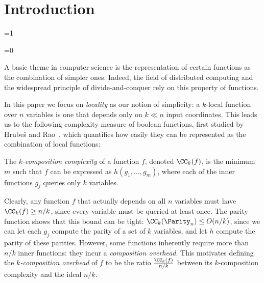\section{Introduction}


\def\colorful{0}


\ifnum\colorful=1
\newcommand{\violet}[1]{{\color{violet}{#1}}}
\newcommand{\orange}[1]{{\color{orange}{#1}}}
\newcommand{\blue}[1]{{{\color{blue}#1}}}
\newcommand{\red}[1]{{\color{red} {#1}}}
\newcommand{\green}[1]{{\color{green} {#1}}}
\newcommand{\pink}[1]{{\color{pink}{#1}}}
\newcommand{\gray}[1]{{\color{gray}{#1}}}

\fi
\ifnum\colorful=0
\newcommand{\violet}[1]{{{#1}}}
\newcommand{\orange}[1]{{{#1}}}
\newcommand{\blue}[1]{{{#1}}}
\newcommand{\red}[1]{{{#1}}}
\newcommand{\green}[1]{{{#1}}}
\newcommand{\gray}[1]{{{#1}}}

\fi


\def\showgray{0}


\renewcommand{\gray}[1]{\vspace{2\baselineskip}}



A basic theme in computer science is the representation of certain functions as the combination of simpler ones.
Indeed, the field of distributed computing and the widespread principle of divide-and-conquer rely on this property of functions.

In this paper we focus on \emph{locality} as our notion of simplicity: a $k$-local function over $n$ variables is one that depends only on $k \ll n$ input coordinates.
This leads us to the following complexity measure of boolean functions, first
studied
by Hrube\v{s} and Rao~\cite{HR15}, which quantifies how easily they can be represented as the combination of local functions:


\begin{definition}
\label{def:complexity}
The \emph{$k$-composition complexity} of a function $f$, denoted $\CC_k(f)$, is the minimum $m$ such that $f$ can be expressed as $h(g_1, \ldots, g_m)$, where each of the inner functions
$g_j$
queries only $k$ variables.
\end{definition}



Clearly, any function $f$ that actually depends on all $n$ variables must have $\CC_k(f) \geq n/k$, since every variable must be queried at least once.
The parity function shows that this bound can be tight: $\CC_k(\Parity_n) \leq O(n/k)$, since we can let each $g_j$ compute the parity of a set of
$k$ variables, and let $h$ compute the parity of these parities.
However, some functions inherently require more than $n/k$ inner functions: they incur a \emph{composition overhead}.  This motivates defining the \emph{$k$-composition overhead} of  $f$ to be the ratio $\frac{\CC_k(f)}{n/k}$ between its $k$-composition complexity and the ideal $n/k$.

